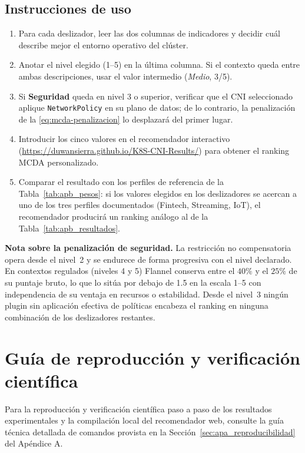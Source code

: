 \subsection*{Instrucciones de uso}

\begin{enumerate}
    \item Para cada deslizador, leer las dos columnas de indicadores y decidir cuál describe mejor el entorno operativo del clúster.
    \item Anotar el nivel elegido (1--5) en la última columna. Si el contexto queda entre ambas descripciones, usar el valor intermedio (\emph{Medio}, 3/5).
    \item Si \textbf{Seguridad} queda en nivel 3 o superior, verificar que el CNI seleccionado aplique \texttt{NetworkPolicy} en su plano de datos; de lo contrario, la penalización de la \cref{eq:mcda-penalizacion} lo desplazará del primer lugar.
    \item Introducir los cinco valores en el recomendador interactivo (\url{https://duwansierra.github.io/K8S-CNI-Results/}) para obtener el ranking MCDA personalizado.
    \item Comparar el resultado con los perfiles de referencia de la Tabla~\ref{tab:apb_pesos}: si los valores elegidos en los deslizadores se acercan a uno de los tres perfiles documentados (Fintech, Streaming, IoT), el recomendador producirá un ranking análogo al de la Tabla~\ref{tab:apb_resultados}.
\end{enumerate}

\noindent\textbf{Nota sobre la penalización de seguridad.} La restricción no compensatoria opera desde el nivel~2 y se endurece de forma progresiva con el nivel declarado. En contextos regulados (niveles 4 y 5) Flannel conserva entre el $40\%$ y el $25\%$ de su puntaje bruto, lo que lo sitúa por debajo de 1.5 en la escala 1--5 con independencia de su ventaja en recursos o estabilidad. Desde el nivel~3 ningún plugin sin aplicación efectiva de políticas encabeza el ranking en ninguna combinación de los deslizadores restantes.

\section{Guía de reproducción y verificación científica} \label{sec:apb_reproducibilidad}

Para la reproducción y verificación científica paso a paso de los resultados experimentales y la compilación local del recomendador web, consulte la guía técnica detallada de comandos provista en la Sección~\ref{sec:apa_reproducibilidad} del Apéndice A.

